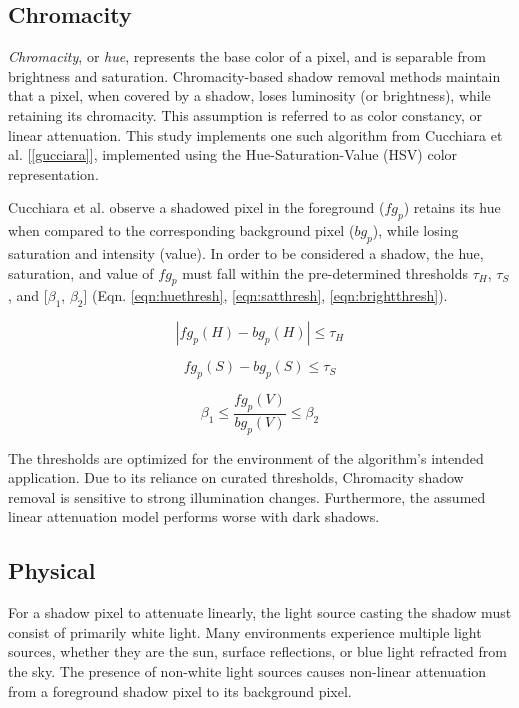 \subsection{Chromacity}

\textit{Chromacity}, or \textit{hue}, represents the base color of a pixel, and is separable from brightness and saturation. Chromacity-based shadow removal methods maintain that a pixel, when covered by a shadow, loses luminosity (or brightness), while retaining its chromacity. This assumption is referred to as  color constancy, or linear attenuation. This study implements one such algorithm from Cucchiara et al. [\ref{gucciara}], implemented using the Hue-Saturation-Value (HSV) color representation. 

Cucchiara et al. observe a shadowed pixel in the foreground ($fg_{p}$) retains its hue when compared to the corresponding background pixel ($bg_{p}$), while losing saturation and intensity (value). In order to be considered a shadow, the hue, saturation, and value of $fg_{p}$ must fall within the pre-determined thresholds $\tau_{H}$, $\tau_{S}$, and [$\beta_{1}$, $\beta_{2}$] (Eqn. \ref{eqn:huethresh}, \ref{eqn:satthresh}, \ref{eqn:brightthresh}).

\begin{equation} \label{eqn:huethresh}
| fg_{p}(H) - bg_{p}(H) | \leq \tau_{H}
\end{equation}

\begin{equation} \label{eqn:satthresh}
fg_{p}(S) - bg_{p}(S) \leq \tau_{S}
\end{equation}

\begin{equation} \label{eqn:brightthresh}
\beta_{1} \leq \dfrac{fg_{p}(V)}{bg_{p}(V)} \leq \beta_{2}
\end{equation}

The thresholds are optimized for the environment of the algorithm's intended application. Due to its reliance on curated thresholds, Chromacity shadow removal is sensitive to strong illumination changes. Furthermore, the assumed linear attenuation model performs worse with dark shadows. 

\subsection{Physical}

For a shadow pixel to attenuate linearly, the light source casting the shadow must consist of primarily white light. Many environments experience multiple light sources, whether they are the sun, surface reflections, or blue light refracted from the sky. The presence of non-white light sources causes non-linear attenuation from a foreground shadow pixel to its background pixel.

